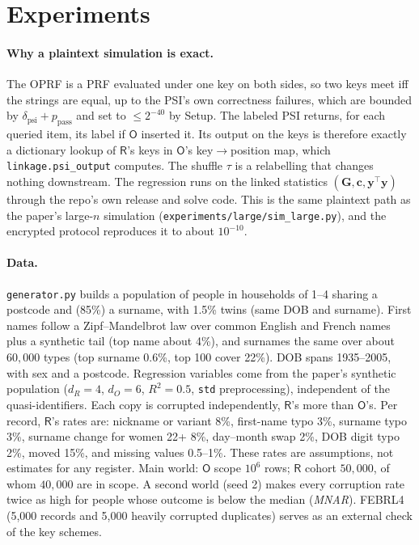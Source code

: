 \documentclass[10pt]{article}
\newcommand{\Rp}{\mathsf{R}}
\newcommand{\Op}{\mathsf{O}}
\newcommand{\by}{\mathbf y}
\newcommand{\bG}{\mathbf G}
\begin{document}
\section{Experiments}
\label{sec:exp}

\paragraph{Why a plaintext simulation is exact.} The OPRF is a PRF evaluated under one key on both sides, so two keys meet iff the strings are equal, up to the PSI's own correctness failures, which are bounded by $\delta_{\mathrm{psi}}+p_{\mathrm{pass}}$ and set to $\le2^{-40}$ by Setup. The labeled PSI returns, for each queried item, its label if $\Op$ inserted it. Its output on the keys is therefore exactly a dictionary lookup of $\Rp$'s keys in $\Op$'s key$\to$position map, which \texttt{linkage.psi\_output} computes. The shuffle $\tau$ is a relabelling that changes nothing downstream. The regression runs on the linked statistics $(\bG,\mathbf c,\by^\top\by)$ through the repo's own release and solve code. This is the same plaintext path as the paper's large-$n$ simulation (\texttt{experiments/large/sim\_large.py}), and the encrypted protocol reproduces it to about $10^{-10}$.

\paragraph{Data.} \texttt{generator.py} builds a population of people in households of 1--4 sharing a postcode and (85\%) a surname, with 1.5\% twins (same DOB and surname). First names follow a Zipf--Mandelbrot law over common English and French names plus a synthetic tail (top name about 4\%), and surnames the same over about $60{,}000$ types (top surname 0.6\%, top 100 cover 22\%). DOB spans 1935--2005, with sex and a postcode. Regression variables come from the paper's synthetic population ($d_R=4$, $d_O=6$, $R^2=0.5$, \texttt{std} preprocessing), independent of the quasi-identifiers. Each copy is corrupted independently, $\Rp$'s more than $\Op$'s. Per record, $\Rp$'s rates are: nickname or variant 8\%, first-name typo 3\%, surname typo 3\%, surname change for women 22+ 8\%, day--month swap 2\%, DOB digit typo 2\%, moved 15\%, and missing values 0.5--1\%. These rates are assumptions, not estimates for any register. Main world: $\Op$ scope $10^6$ rows; $\Rp$ cohort $50{,}000$, of whom $40{,}000$ are in scope. A second world (seed 2) makes every corruption rate twice as high for people whose outcome is below the median (\emph{MNAR}). FEBRL4~\cite{christen2008febrl} (5,000 records and 5,000 heavily corrupted duplicates) serves as an external check of the key schemes.
\end{document}
